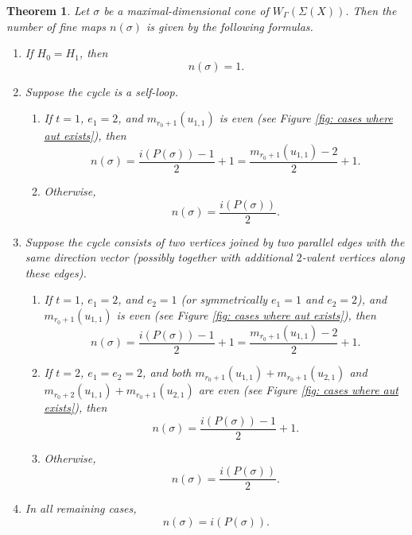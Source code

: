 \documentclass{article}
\newtheorem{theorem}[definition]{Theorem}
\begin{document}
    
\begin{theorem}\label{thm: calculation of n(sigma)}
Let $\sigma$ be a maximal-dimensional cone of $W_\Gamma(\Sigma(X))$. Then the number of fine maps $n(\sigma)$ is given by the following formulas.

\begin{enumerate}[label=(\arabic*)]
    \item If $H_0 = H_1$, then
    \[
        n(\sigma)=1.
    \]

    \item Suppose the cycle is a self-loop.
    \begin{enumerate}
        \item If $t=1$, $e_1=2$, and $m_{r_0+1}(u_{1,1})$ is even (see Figure \ref{fig: cases where aut exists}), then
        \[
            n(\sigma)
            =\frac{i(P(\sigma))-1}{2}+1
            =\frac{m_{r_0+1}(u_{1,1})-2}{2}+1.
        \]

        \item Otherwise,
        \[
            n(\sigma)=\frac{i(P(\sigma))}{2}.
        \]
    \end{enumerate}

    \item Suppose the cycle consists of two vertices joined by two parallel edges with the same direction vector (possibly together with additional $2$-valent vertices along these edges).
    \begin{enumerate}
        \item If $t=1$, $e_1=2$, and $e_2=1$ (or symmetrically $e_1=1$ and $e_2=2$), and $m_{r_0+1}(u_{1,1})$ is even (see Figure \ref{fig: cases where aut exists}), then
        \[
            n(\sigma)
            =\frac{i(P(\sigma))-1}{2}+1 
            =\frac{m_{r_0+1}(u_{1,1})-2}{2}+1.
        \]

        \item If $t=2$, $e_1=e_2=2$, and both $m_{r_0+1}(u_{1,1}) + m_{r_0+1}(u_{2,1})$ and $m_{r_0+2}(u_{1,1})+ m_{r_0+1}(u_{2,1})$ are even (see Figure \ref{fig: cases where aut exists}), then
        \[
            n(\sigma)
            =\frac{i(P(\sigma))-1}{2}+1.
        \]

        \item Otherwise,
        \[
            n(\sigma)=\frac{i(P(\sigma))}{2}.
        \]
    \end{enumerate}

    \item In all remaining cases,
    \[
        n(\sigma)=i(P(\sigma)).
    \]
\end{enumerate}
\end{theorem}
\end{document}
